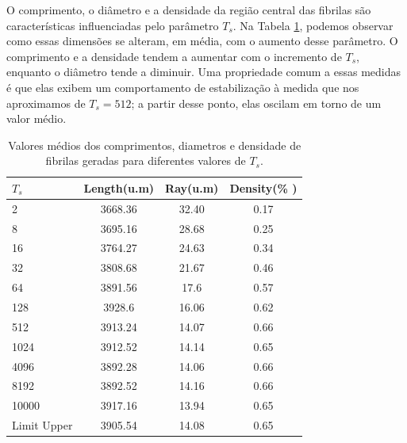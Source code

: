 \documentclass{article}
\begin{document}
    O comprimento, o diâmetro e a densidade da região central das fibrilas são características influenciadas pelo 
    parâmetro \(T_{s}\). Na Tabela \ref{tab1}, podemos observar como essas dimensões se alteram, em média, com o 
    aumento desse parâmetro. O comprimento e a densidade tendem a aumentar com o incremento de \(T_{s}\), enquanto 
    o diâmetro tende a diminuir. Uma propriedade comum a essas medidas é que elas exibem um comportamento de 
    estabilização à medida que nos aproximamos de \(T_{s} = 512\); a partir desse ponto, elas oscilam em torno de um 
    valor médio. 

    \begin{table}[H]
        \caption{Valores médios dos comprimentos, diametros e densidade de fibrilas geradas para diferentes valores de \(T_{s}\).}

        \centering  %
        \begin{tabular}{lccc}
        \hline
        \textbf{$T_{s}$} & \multicolumn{1}{c}{\textbf{Length(u.m)}} & \textbf{Ray(u.m)} & \textbf{Density(\% )} \\ \hline
        2                & 3668.36                                   & 32.40             & 0.17                  \\
        8                & 3695.16                                   & 28.68             & 0.25                  \\
        16               & 3764.27                                   & 24.63             & 0.34                  \\
        32               & 3808.68                                   & 21.67             & 0.46                  \\
        64               & 3891.56                                   & 17.6              & 0.57                  \\
        128              & 3928.6                                    & 16.06             & 0.62                  \\
        512              & 3913.24                                   & 14.07             & 0.66                  \\
        1024             & 3912.52                                   & 14.14             & 0.65                  \\
        4096             & 3892.28                                   & 14.06             & 0.66                  \\
        8192             & 3892.52                                   & 14.16             & 0.66                  \\
        10000            & 3917.16                                   & 13.94             & 0.65                  \\ \hline
        \multicolumn{1}{l}{Limit Upper} & 3905.54                    & 14.08             & 0.65                  \\ \hline
        \end{tabular}
        \label{tab1}  %
    \end{table}
\end{document}
